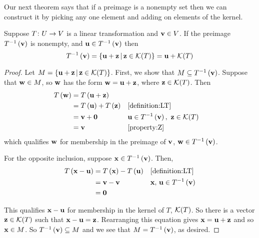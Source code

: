 \documentclass{ximera}
\begin{document}
Our next theorem says that if a preimage is a nonempty set then we can construct it by picking any one element and adding on elements of the kernel.

\begin{theorem}
\label{theorem:KPI}

Suppose $T\colon U\rightarrow V$ is a linear transformation and $\mathbf{v}\in V$.  If the preimage $T^{-1}\left(\mathbf{v}\right)$ is nonempty, and $\mathbf{u}\in T^{-1}\left(\mathbf{v}\right)$  then
\[
T^{-1}\left(\mathbf{v}\right)=
\left\lbrace\mathbf{u}+\mathbf{z}\,\middle|\,\mathbf{z}\in\mathcal{K}\!\left(T\right)\right\rbrace
=\mathbf{u}+\mathcal{K}\!\left(T\right)
\]

\begin{proof}
Let $M=\left\lbrace\mathbf{u}+\mathbf{z}\,\middle|\,\mathbf{z}\in\mathcal{K}\!\left(T\right)\right\rbrace$.  First, we show that $M\subseteq T^{-1}\left(\mathbf{v}\right)$.  Suppose that $\mathbf{w}\in M$, so $\mathbf{w}$ has the form $\mathbf{w}=\mathbf{u}+\mathbf{z}$, where $\mathbf{z}\in\mathcal{K}\!\left(T\right)$.  Then
\begin{align*}
\lteval{T}{\vect{w}}&=\lteval{T}{\vect{u}+\vect{z}}\\
&=\lteval{T}{\vect{u}}+\lteval{T}{\vect{z}}&&\ref{definition:LT}\\
&=\vect{v}+\zerovector&&\vect{u}\in\preimage{T}{\vect{v}},\ \vect{z}\in\krn{T}\\
&=\vect{v}&&\ref{property:Z}
\end{align*}
which qualifies $\mathbf{w}$ for membership in the preimage of $\mathbf{v}$, $\mathbf{w}\in T^{-1}\left(\mathbf{v}\right)$.



For the opposite inclusion, suppose $\mathbf{x}\in T^{-1}\left(\mathbf{v}\right)$.  Then,
\begin{align*}
T\left(\mathbf{x}-\mathbf{u}\right)&=T\left(\mathbf{x}\right)-T\left(\mathbf{u}\right)&&\ref{definition:LT}\\
&=\mathbf{v}-\mathbf{v}&&\mathbf{x},\,\mathbf{u}\in T^{-1}\left(\mathbf{v}\right)\\
&=\mathbf{0}
\end{align*}




This qualifies $\mathbf{x}-\mathbf{u}$ for membership in the kernel of $T$, $\mathcal{K}\!\left(T\right)$.  So there is a vector $\mathbf{z}\in\mathcal{K}\!\left(T\right)$ such that $\mathbf{x}-\mathbf{u}=\mathbf{z}$.  Rearranging this equation gives $\mathbf{x}=\mathbf{u}+\mathbf{z}$ and so $\mathbf{x}\in M$.  So $T^{-1}\left(\mathbf{v}\right)\subseteq M$ and we see that $M=T^{-1}\left(\mathbf{v}\right)$, as desired.



\end{proof}
\end{theorem}
\end{document}
